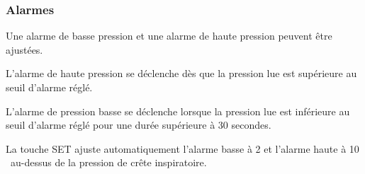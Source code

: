 \subsubsection{Alarmes}

Une alarme de basse pression et une alarme de haute pression peuvent être ajustées.

L'alarme de haute pression se déclenche dès que la pression lue est supérieure
au seuil d'alarme réglé.

L'alarme de pression basse se déclenche lorsque la pression lue est inférieure
au seuil d'alarme réglé pour une durée supérieure à 30 secondes.

La touche SET ajuste automatiquement l'alarme basse à 2 \cmh et l'alarme haute
à 10 \cmh\ au-dessus de la pression de crête inspiratoire.

